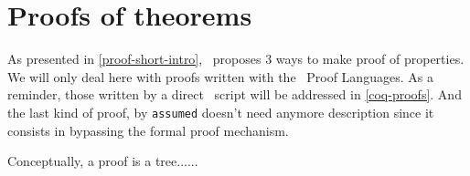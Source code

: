 


\section{Proofs of  theorems}
As presented in \ref{proof-short-intro}, \focal\ proposes 3 ways to
make proof of properties. We will only deal here with proofs written
with the \focal\ Proof Languages. As a reminder, those written by a
direct \coq\ script will be addressed in \ref{coq-proofs}. And the
last kind of proof, by {\tt assumed} doesn't need anymore description
since it consists in bypassing the formal proof mechanism.

Conceptually, a proof is a tree......
